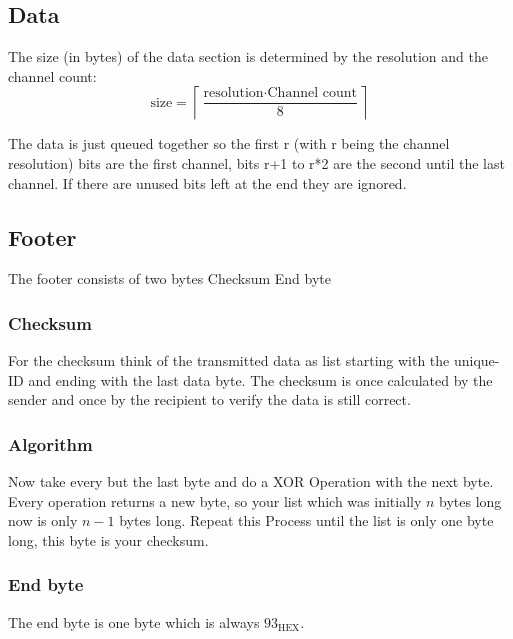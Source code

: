 \documentclass{report}
\begin{document}
  \subsection{Data}
    The size (in bytes) of the data section is determined by
    the resolution and the channel count:
    \begin{equation}
        \text{size} = \left\lceil{\frac{\text{resolution} \cdot \text{Channel count}}{8}} \right\rceil
    \end{equation}

   The data is just queued together so the first r (with r being the channel
   resolution) bits are the first channel, bits r+1 to r*2 are the second
   until the last channel. If there are unused bits left at the end they are
   ignored.

  \subsection{Footer}
    The footer consists of two bytes Checksum End byte

    \subsubsection{Checksum}
     For the checksum think of the transmitted data as list starting with the
     unique-ID and ending with the last data byte. The checksum is once
     calculated by the sender and once by the recipient to verify the data is
     still correct.

    \subsubsection{Algorithm}
     Now take every but the last byte and do a XOR Operation with the next byte.
     Every operation returns a new byte, so your list which was initially $n$
     bytes long now is only $n-1$ bytes long. Repeat this Process until the list
     is only one byte long, this byte is your checksum.

    \subsubsection{End byte}
     The end byte is one byte which is always $93_\text{HEX}$.
\end{document}
